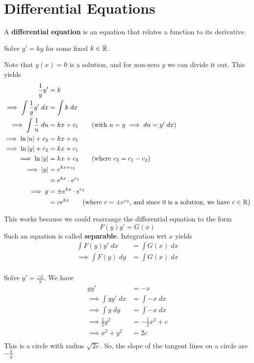 \documentclass{article}
\begin{document}
\section{Differential Equations}
\begin{definition}
  A \textbf{differential equation} is an equation that relates a function to its derivative.
\end{definition}
\begin{example}
  Solve $y' = ky$ for some fixed $k \in \mathbb{R}$.

  Note that $y(x) = 0$ is a solution, and for non-zero $y$ we can divide it out.
  This yields
  \begin{align*}
    \frac{1}{y}y' &= k\\
    \implies \int \frac{1}{y} y' \; dx &= \int k \; dx\\
    \implies \int \frac{1}{u} \; du &= kx +c_1 \tag{with $u = y \implies du = y' \; dx$}\\
    \implies \ln |u| + c_2 &= kx + c_1\\
    \implies \ln |y| + c_2 &= kx + c_1\\
    \implies \ln |y| &= kx + c_3 \tag{where $c_3 = c_1 - c_2$}\\
    \implies |y| &= e^{kx + c_3}\\
    &= e^{kx} \cdot e^{c_3}\\
    \implies y &= \pm e^{kx} \cdot e^{c_3}\\
    &= ce^{kx} \tag{where $c = \pm e^{c_3}$, and since $0$ is a solution, we have $c \in \R$}\\
  \end{align*}
\end{example}
\begin{remark}
  This works because we could rearrange the differential equation to the form \[
    F(y)y' = G(x)
  \]
  Such an equation is called \textbf{separable}. Integration wrt $x$ yields
  \begin{align*}
    \int F(y)y' \; dx &= \int G(x) \; dx\\
    \implies \int F(y) \; dy &= \int G(x) \; dx\\
  \end{align*}
\end{remark}
\begin{example}
  Solve $y' =  \frac{-x}{y}$. We have
  \begin{align*}
    yy' &= -x\\
    \implies \int yy' \; dx &= \int -x \; dx\\
    \implies \int y \; dy &= \int -x \; dx\\
    \implies \frac{1}{2}y^2 &= -\frac{1}{2} x^2 + c\\
    \implies x^2 + y^2 &= 2c\\
  \end{align*}
  This is a circle with radius $\sqrt{2c}$. So, the slope of the tangent lines on a circle are $-\frac{x}{y}$
\end{example}
\end{document}
